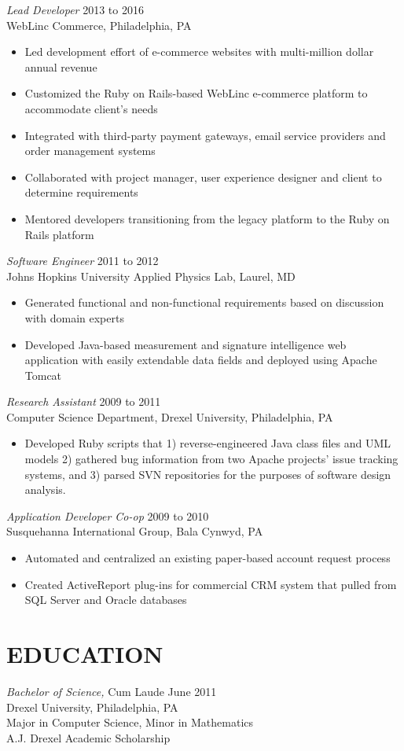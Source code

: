 \documentclass[line]{res}
\begin{document}
\begin{resume}
{\sl Lead Developer} \hfill 2013 to 2016 \\
WebLinc Commerce, Philadelphia, PA
\begin{itemize} \itemsep -2pt
\item Led development effort of e-commerce websites with multi-million dollar annual revenue
\item Customized the Ruby on Rails-based WebLinc e-commerce platform to accommodate client's needs
\item Integrated with third-party payment gateways, email service providers and order management systems
\item Collaborated with project manager, user experience designer and client to determine requirements
\item Mentored developers transitioning from the legacy platform to the Ruby on Rails platform
\end{itemize}

{\sl Software Engineer} \hfill 2011 to 2012 \\
Johns Hopkins University Applied Physics Lab, Laurel, MD
\begin{itemize}  \itemsep -2pt
\item Generated functional and non-functional requirements based on discussion with domain experts
\item Developed Java-based measurement and signature intelligence web application with easily extendable data fields and deployed using Apache Tomcat
\end{itemize}

{\sl Research Assistant} \hfill            2009 to 2011 \\
Computer Science Department, Drexel University, Philadelphia, PA
\begin{itemize}  \itemsep -2pt
\item Developed Ruby scripts that 1) reverse-engineered Java class files and UML models 2) gathered bug information from two Apache projects’ issue tracking systems, and 3) parsed SVN repositories for the purposes of software design analysis.
\end{itemize}

{\sl Application Developer Co-op} \hfill        2009 to 2010 \\
Susquehanna International Group, Bala Cynwyd, PA
\begin{itemize}  \itemsep -2pt
\item Automated and centralized an existing paper-based account request process
\item Created ActiveReport plug-ins for commercial CRM system that pulled from SQL Server and Oracle databases
\end{itemize}

\section{EDUCATION}
{\sl Bachelor of Science,} Cum Laude \hfill June 2011 \\
Drexel University, Philadelphia, PA \\
Major in Computer Science, Minor in Mathematics \\
A.J. Drexel Academic Scholarship

\end{resume}
\end{document}
